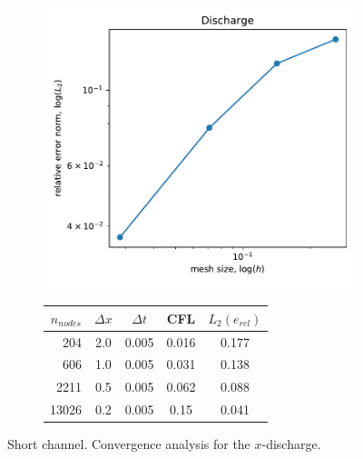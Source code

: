 \begin{figure}
\begin{subfigure}{0.4\textwidth}
    \includegraphics[width=\textwidth]{img/eulerian/jump/momentum_convergence.pdf}    
\end{subfigure}
\hfill
\begin{subfigure}{0.58\textwidth}
    \begin{tabular}{>{\small}rcccc} \hline
    $n_{nodes}$ & $\Delta x$ & $\Delta t$ & CFL   & $L_2(e_{rel})$ \\ \hline
    204         &        2.0 &      0.005 & 0.016 & 0.177 \\
    606         &        1.0 &      0.005 & 0.031 & 0.138 \\
    2211        &        0.5 &      0.005 & 0.062 & 0.088 \\
    13026       &        0.2 &      0.005 & 0.15  & 0.041 \\ \hline
    \end{tabular}
\end{subfigure}
\caption{Short channel. Convergence analysis for the $x$-discharge.}
\label{hydraulic_jump_convergence}
\end{figure}


